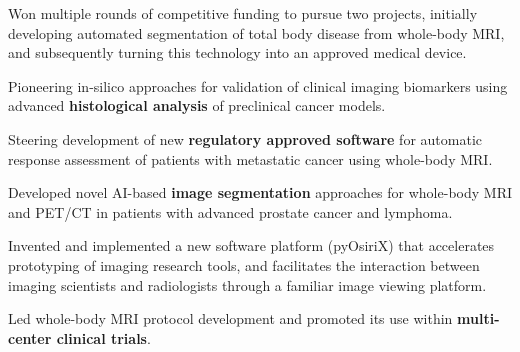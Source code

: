 \documentclass[]{mbcv}
\begin{document}
\begin{minipage}[t]{0.65\textwidth}
\sectionsep

Won multiple rounds of competitive funding to pursue two projects, initially developing automated segmentation of total body disease from whole-body MRI, and subsequently turning this technology into an approved medical device. 

\vspace*{10pt}
\begin{tightemize}
\item Pioneering in-silico approaches for validation of clinical imaging biomarkers using advanced \textbf{histological analysis} of preclinical cancer models.
\item Steering development of new \textbf{regulatory approved software} for automatic response assessment of patients with metastatic cancer using whole-body MRI.
\item Developed novel AI-based \textbf{image segmentation} approaches for whole-body MRI and PET/CT in patients with advanced prostate cancer and lymphoma.
\item Invented and implemented a new software platform (pyOsiriX) that accelerates prototyping of imaging research tools, and facilitates the interaction between imaging scientists and radiologists through a familiar image viewing platform.
\item Led whole-body MRI protocol development and promoted its use within \textbf{multi-center clinical trials}. 
\end{tightemize}

\end{minipage}

\newpage
\end{document}
